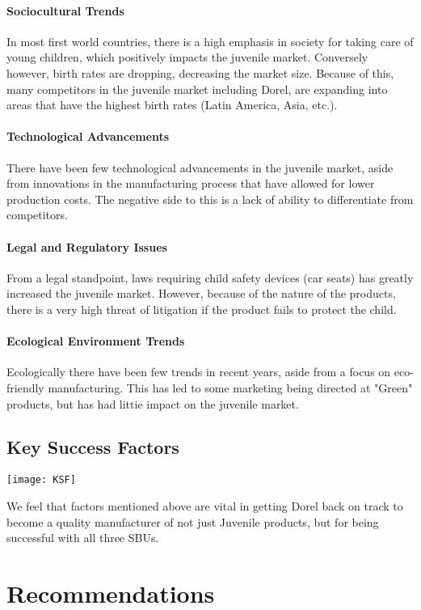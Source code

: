 {\subsubsection{Sociocultural Trends}
In most first world countries, there is a high emphasis in society for taking care of young children, which positively impacts the juvenile market.  Conversely however, birth rates are dropping, decreasing the market size.  Because of this, many competitors in the juvenile market including Dorel, are expanding into areas that have the highest birth rates (Latin America, Asia, etc.).
\subsubsection{Technological Advancements}
There have been few technological advancements in the juvenile market, aside from innovations in the manufacturing process that have allowed for lower production costs.  The negative side to this is a lack of ability to differentiate from competitors.
\subsubsection{Legal and Regulatory Issues}
From a legal standpoint, laws requiring child safety devices (car seats) has greatly increased the juvenile market.  However, because of the nature of the products, there is a very high threat of litigation if the product fails to protect the child.

\subsubsection{Ecological Environment Trends}
Ecologically there have been few trends in recent years, aside from a focus on eco-friendly manufacturing.  This has led to some marketing being directed at "Green" products, but has had littie impact on the juvenile market.	

\section{Key Success Factors}
\centerline{\texttt{[image: KSF]}}
We feel that factors mentioned above are vital in getting Dorel back on track to become a quality manufacturer of not just Juvenile products, but for being successful with all three SBUs.  

\chapter{Recommendations}
\label{chp:recommendations}

}
